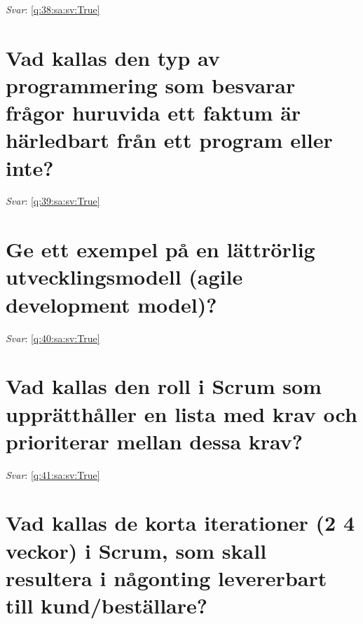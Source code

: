 \documentclass[a4paper,11pt,oneside]{book}
\begin{document}
\begin{sloppypar}
\textit{Svar}: \autoref{q:38:sa:sv:True}



\section{Vad kallas den typ av programmering som besvarar fr\r{a}gor huruvida ett faktum \"ar h\"arledbart fr\r{a}n ett program eller inte?}

\label{q:39:sa:sv:False}

\vspace{2cm}

\noindent\makebox[\textwidth]{\hrulefill}

\vspace{1cm}

\textit{Svar}: \autoref{q:39:sa:sv:True}



\section{Ge ett exempel p\r{a} en l\"attr\"orlig utvecklingsmodell (agile development model)?}

\label{q:40:sa:sv:False}

\vspace{2cm}

\noindent\makebox[\textwidth]{\hrulefill}

\vspace{1cm}

\textit{Svar}: \autoref{q:40:sa:sv:True}



\section{Vad kallas den roll i Scrum som uppr\"atth\r{a}ller en lista med krav och prioriterar mellan dessa krav?}

\label{q:41:sa:sv:False}

\vspace{2cm}

\noindent\makebox[\textwidth]{\hrulefill}

\vspace{1cm}

\textit{Svar}: \autoref{q:41:sa:sv:True}



\section{Vad kallas de korta iterationer (2 {\textendash} 4 veckor) i Scrum, som skall resultera i n\r{a}gonting levererbart till kund/best\"allare?}


\end{sloppypar}
\end{document}
